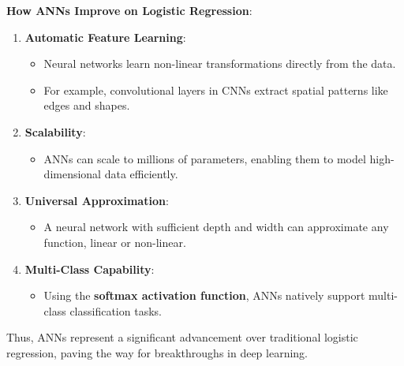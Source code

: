 \textbf{How ANNs Improve on Logistic Regression}:
\begin{enumerate}
    \item \textbf{Automatic Feature Learning}:
    \begin{itemize}
        \item Neural networks learn non-linear transformations directly from the data.
        \item For example, convolutional layers in CNNs extract spatial patterns like edges and shapes.
    \end{itemize}
    \item \textbf{Scalability}:
    \begin{itemize}
        \item ANNs can scale to millions of parameters, enabling them to model high-dimensional data efficiently.
    \end{itemize}
    \item \textbf{Universal Approximation}:
    \begin{itemize}
        \item A neural network with sufficient depth and width can approximate any function, linear or non-linear.
    \end{itemize}
    \item \textbf{Multi-Class Capability}:
    \begin{itemize}
        \item Using the \textbf{softmax activation function}, ANNs natively support multi-class classification tasks.
    \end{itemize}
\end{enumerate}
Thus, ANNs represent a significant advancement over traditional logistic regression, paving the way for breakthroughs in deep learning.








